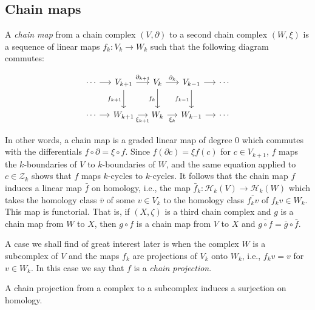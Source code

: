 \subsection{{Chain maps}}\label{sec:chain-maps}

{A \emph{chain map} from a chain complex $(V,\partial)$ to a second chain complex $(W,\xi)$ is a sequence of linear maps $f_k:V_k\to W_k$ such that the following diagram commutes:}

\[
\begin{tikzcd}[column sep=1.2em,row sep=2.2em]
\cdots \arrow[r] & V_{k+1} \arrow[r,"\partial_{k+1}"] \arrow[d,"f_{k+1}"'] & V_k \arrow[r,"\partial_k"] \arrow[d,"f_k"'] & V_{k-1} \arrow[r] \arrow[d,"f_{k-1}"'] & \cdots \\
\cdots \arrow[r] & W_{k+1} \arrow[r,"\xi_{k+1}"'] & W_k \arrow[r,"\xi_k"'] & W_{k-1} \arrow[r] & \cdots
\end{tikzcd}
\]

{In other words, a chain map is a graded linear map of degree 0 which commutes with the differentials $f\circ\partial=\xi\circ f$. Since $f(\partial c)=\xi f(c)$ for $c\in V_{k+1}$, $f$ maps the $k$-boundaries of $V$ to $k$-boundaries of $W$, and the same equation applied to $c\in\mathcal Z_k$ shows that $f$ maps $k$-cycles to $k$-cycles. It follows that the chain map $f$ induces a linear map $\bar f$ on homology, i.e., the map $\bar f_k:\mathcal H_k(V)\to\mathcal H_k(W)$ which takes the homology class $\bar v$ of some $v\in V_k$ to the homology class $\overline{f_kv}$ of $f_kv\in W_k$. This map is functorial. That is, if $(X,\zeta)$ is a third chain complex and $g$ is a chain map from $W$ to $X$, then $g\circ f$ is a chain map from $V$ to $X$ and $\overline{g\circ f}=\bar g\circ\bar f$.}

{A case we shall find of great interest later is when the complex $W$ is a subcomplex of $V$ and the maps $f_k$ are projections of $V_k$ onto $W_k$, i.e., $f_kv=v$ for $v\in W_k$. In this case we say that $f$ is a \emph{chain projection}.}

\begin{Proposition}\label{prop:chain-projection-homology-surjection}
{A chain projection from a complex to a subcomplex induces a surjection on homology.}
\end{Proposition}

